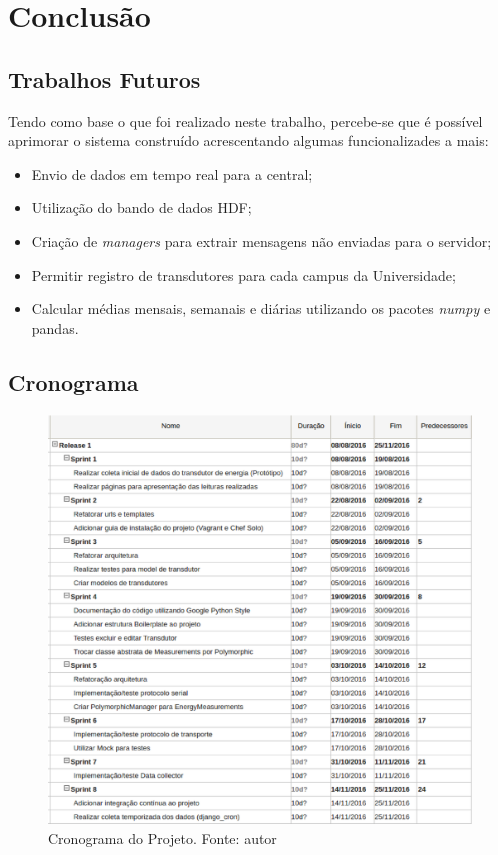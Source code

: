 \chapter{Conclusão}

\section{Trabalhos Futuros}
Tendo como base o que foi realizado neste trabalho, percebe-se que é possível aprimorar o sistema construído acrescentando algumas funcionalizades a mais:
\begin{itemize}
    \item Envio de dados em tempo real para a central;
    \item Utilização do bando de dados HDF;
    \item Criação de \textit{managers} para extrair mensagens não enviadas para o servidor;
    \item Permitir registro de transdutores para cada campus da Universidade;
    \item Calcular médias mensais, semanais e diárias utilizando os pacotes \textit{numpy} e {pandas}.
\end{itemize}

\section{Cronograma}
\begin{figure}[!htpb]
    \centering
    \includegraphics[keepaspectratio=true,scale=0.5]{figuras/cronograma.eps}
    \caption{Cronograma do Projeto. Fonte: autor}
    \label{cronograma}
\end{figure}